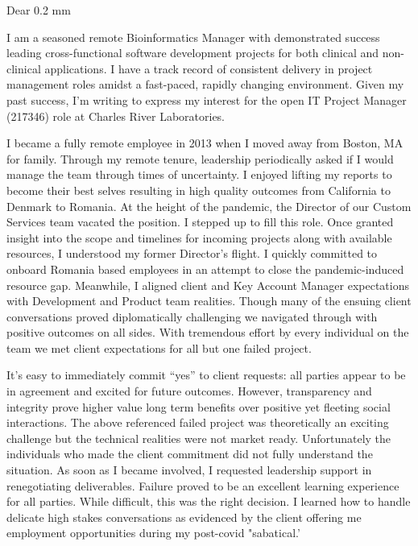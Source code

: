 \documentclass[10pt,letterpaper]{article}
\newcommand{\titleto}[1]{\renewcommand{\titleto}{#1}}
\newcommand{\nameto}[1]{\renewcommand{\nameto}{#1}}
\begin{document}
Dear \titleto \hspace{0.2 mm} \nameto,
\begin{flushleft}
I am a seasoned remote Bioinformatics Manager with demonstrated success leading cross-functional software development projects for both clinical and non-clinical applications. I have a track record of consistent delivery in project management roles amidst a fast-paced, rapidly changing environment. Given my past success, I’m writing to express my interest for the open IT Project Manager (217346) role at Charles River Laboratories.

I became a fully remote employee in 2013 when I moved away from Boston, MA for family. Through my remote tenure, leadership periodically asked if I would manage the team through times of uncertainty. I enjoyed lifting my reports to become their best selves resulting in high quality outcomes from California to Denmark to Romania. At the height of the pandemic, the Director of our Custom Services team vacated the position. I stepped up to fill this role. Once granted insight into the scope and timelines for incoming projects along with available resources, I understood my former Director’s flight. I quickly committed to onboard Romania based employees in an attempt to close the pandemic-induced resource gap. Meanwhile, I aligned client and Key Account Manager expectations with Development and Product team realities. Though many of the ensuing client conversations proved diplomatically challenging we navigated through with positive outcomes on all sides. With tremendous effort by every individual on the team we met client expectations for all but one failed project.

It’s easy to immediately commit “yes” to client requests: all parties appear to be in agreement and excited for future outcomes. However, transparency and integrity prove higher value long term benefits over positive yet fleeting social interactions. The above referenced failed project was theoretically an exciting challenge but the technical realities were not market ready. Unfortunately the individuals who made the client commitment did not fully understand the situation. As soon as I became involved, I requested leadership support in renegotiating deliverables. Failure proved to be an excellent learning experience for all parties. While difficult, this was the right decision. I learned how to handle delicate high stakes conversations as evidenced by the client offering me employment opportunities during my post-covid "sabatical.'


\end{flushleft}
\end{document}
